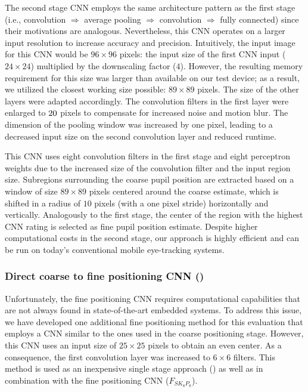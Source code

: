 The second stage CNN employs the same architecture pattern as the first stage
(i.e., convolution $\Rightarrow$ average pooling $\Rightarrow$ convolution $\Rightarrow$ fully connected) since their motivations are analogous.
Nevertheless, this CNN operates on a larger input resolution to increase
accuracy and precision.
Intuitively, the input image for this CNN would be $96\times96$ pixels: the input
size of the first CNN input ($24\times24$) multiplied by the downscaling factor
($4$).
However, the resulting memory requirement for this size was larger than
available on our test device; as a result, we utilized the closest working size
possible: $89\times89$ pixels.
The size of the other layers were adapted accordingly.
The convolution filters in the first layer were enlarged to $20\time20$ pixels to
compensate for increased noise and motion blur.
The dimension of the pooling window was increased by one pixel,
leading to a decreased input size on the second convolution layer and reduced runtime.

This CNN uses eight convolution filters in the first stage and eight perceptron weights due to the
increased size of the convolution filter and the input region size.
Subregions surrounding the coarse pupil position are extracted based on a window
of size $89\times89$ pixels centered around the coarse estimate, which is
shifted in a radius of $10$ pixels (with a one pixel stride) horizontally and vertically.
Analogously to the first stage, the center of the region with the highest CNN
rating is selected as fine pupil position estimate.
Despite higher computational costs in the second stage, our approach is highly
efficient and can be run on today's conventional mobile eye-tracking systems.


\subsubsection{Direct coarse to fine positioning CNN (\csin{})}
\label{subsec:trainingdirect}

Unfortunately, the fine positioning CNN requires computational capabilities that
are not always found in state-of-the-art embedded systems.
To address this issue, we have developed one additional fine positioning method
for this evaluation that employs a CNN similar to the ones used in the coarse
positioning stage.
However, this CNN uses an input size of $25\times25$ pixels to obtain an even
center.
As a consequence, the first convolution layer was increased to $6 \times 6$ filters.
This method is used as an inexpensive single stage approach (\csin{}) as well as
in combination with the fine positioning CNN ($F_{SK_8P_8}$).

